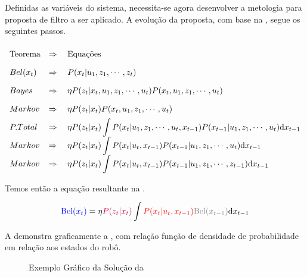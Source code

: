 Definidas as variáveis do sistema, necessita-se agora desenvolver a metologia para proposta de filtro a ser aplicado. A evolução da proposta, com base na , segue os seguintes passos.

\begin{equation*}
    \begin{array}{ll}
        \text{Teorema} & \Rightarrow\textcolor{white}{\displaystyle\int}\text{Equações} \\
        Bel(x_t) & \Rightarrow\textcolor{white}{\displaystyle\int} P(x_t| u_1, z_1,  \cdots, z_t) \\
        Bayes & \Rightarrow\textcolor{white}{\displaystyle\int} \eta P(z_t|x_t,  u_1, z_1,  \cdots,  u_t)P(x_t, u_1, z_1, \cdots, u_t) \\
        Markov & \Rightarrow\textcolor{white}{\displaystyle\int} \eta P(z_t|x_t)P(x_t, u_1, z_1, \cdots, u_t) \\
        P. Total & \Rightarrow\textcolor{white}{\displaystyle\int} \eta P(z_t|x_t)\displaystyle\int P(x_t| u_1, z_1, \cdots, u_t,x_{t-1})P(x_{t-1}| u_1, z_1, \cdots, u_t)\text{d}x_{t-1}\\
        Markov & \Rightarrow\textcolor{white}{\displaystyle\int} \eta P(z_t|x_t) \displaystyle\int P(x_t| u_t,x_{t-1})P(x_{t-1}| u_1, z_1, \cdots, u_t)\text{d}x_{t-1} \\
        Markov & \Rightarrow\textcolor{white}{\displaystyle\int} \eta P(z_t|x_t) \displaystyle\int P(x_t| u_t,x_{t-1}){P(x_{t-1}| u_1, z_1, \cdots, z_{t-1}}){\text{d}x_{t-1}} \\
    \end{array}   
\end{equation*}

Temos então a equação resultante na .

\begin{equation}
    \textcolor{blue}{\text{Bel}(x_t)} =\eta \textcolor{purple}{P(z_t|x_t)}\displaystyle\int \textcolor{red}{P(x_t| u_t,x_{t-1})}\textcolor{gray}{\text{Bel}(x_{t-1})}\text{d}x_{t-1}
    \label{eq:kalmbayes}
\end{equation}

A  demonstra graficamente a , com relação função de densidade de probabilidade em relação aos estados do robô.
    
\begin{figure}[!ht]
    \centering
    
    \caption{Exemplo Gráfico da Solução da }
    \label{fig::kalm1}
\end{figure}

